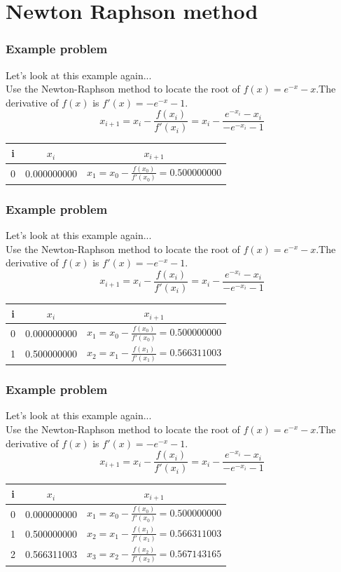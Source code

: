 \documentclass{if-beamer}
\begin{document}
\section{Newton Raphson method}
\begin{frame}
\frametitle{Example problem}
Let's look at this example again...\\\vspace{3pt}
Use the Newton-Raphson method to locate the root of $f(x) = e^{-x}-x$.The derivative of $f(x)$ is $f'(x) = -e^{-x}-1$.
$$x_{i+1} = x_i - \frac{f(x_i)}{f'(x_i)} =  x_i - \frac{e^{-x_i}-x_i}{-e^{-x_i}-1}$$
\begin{table}
	\begin{tabular}{c | c | c}
		i & $x_i$ & $x_{i+1}$ \\
		\hline
		0 & 0.000000000 & $x_1= x_0 - \frac{f(x_0)}{f'(x_0)} = 0.500000000$\\ 
	\end{tabular}
\end{table}

\end{frame}

\begin{frame}
\frametitle{Example problem}
Let's look at this example again...\\\vspace{3pt}
Use the Newton-Raphson method to locate the root of $f(x) = e^{-x}-x$.The derivative of $f(x)$ is $f'(x) = -e^{-x}-1$.
$$x_{i+1} = x_i - \frac{f(x_i)}{f'(x_i)} =  x_i - \frac{e^{-x_i}-x_i}{-e^{-x_i}-1}$$
\begin{table}
	\begin{tabular}{c | c | c}
		i & $x_i$ & $x_{i+1}$ \\
		\hline
		0 & 0.000000000 & $x_1= x_0 - \frac{f(x_0)}{f'(x_0)} = 0.500000000$\\ 
		1 & 0.500000000 & $x_2= x_1 - \frac{f(x_1)}{f'(x_1)} = 0.566311003$ \\
	\end{tabular}
\end{table}

\end{frame}

\begin{frame}
\frametitle{Example problem}
Let's look at this example again...\\\vspace{3pt}
Use the Newton-Raphson method to locate the root of $f(x) = e^{-x}-x$.The derivative of $f(x)$ is $f'(x) = -e^{-x}-1$.
$$x_{i+1} = x_i - \frac{f(x_i)}{f'(x_i)} =  x_i - \frac{e^{-x_i}-x_i}{-e^{-x_i}-1}$$
\begin{table}
	\begin{tabular}{c | c | c}
		i & $x_i$ & $x_{i+1}$ \\
		\hline
		0 & 0.000000000 & $x_1= x_0 - \frac{f(x_0)}{f'(x_0)} = 0.500000000$\\ 
		1 & 0.500000000 & $x_2= x_1 - \frac{f(x_1)}{f'(x_1)} = 0.566311003$ \\
		2 & 0.566311003	 & $x_3= x_2 - \frac{f(x_2)}{f'(x_2)} = 0.567143165	$ 
	\end{tabular}
\end{table}

\end{frame}
\end{document}
